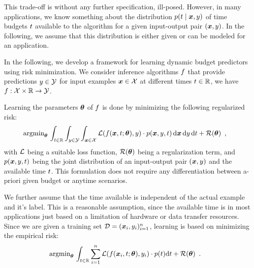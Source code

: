 \documentclass{bmvc2k}
\begin{document}
    This trade-off is without any further specification, ill-posed. However, in many applications,
    we know something about the distribution $p(t \;|\; \bm{x}, y)$ 
    of time budgets $t$ available to the algorithm for a given input-output pair $(\bm{x}, y)$.
    In the following, we assume that this distribution is either given or can be modeled for
    an application. 
    
    In the following, 
    we develop a framework for learning dynamic budget predictors using risk minimization.
    We consider inference algorithms $f$ that provide predictions $y \in \mathcal{Y}$ 
    for input examples $\bm{x} \in \mathcal{X}$
    at different times $t \in \mathbb{R}$, \ie we have $f: \mathcal{X} \times \mathbb{R} \rightarrow \mathcal{Y}$.

    Learning the parameters $\bm{\theta}$ of $f$ 
    is done by minimizing the following regularized risk:
    \begin{align}
        \label{eq:emprisk1}
        &\operatorname{\text{argmin}}_{\bm{\theta}}\, \int_{t \in \mathbb{R}} \int_{y \in \mathcal{Y}} \int_{\bm{x} \in \mathcal{X}} 
        \mathcal{L}( f(\bm{x}, t; \bm{\theta}), y ) \cdot p(\bm{x}, y, t) \,\mathrm{d}\bm{x}\, \mathrm{d}y\, \mathrm{d} t + \mathcal{R}(\bm{\theta}) \enspace,
    \end{align}
    with $\mathcal{L}$ being a suitable loss function, $\mathcal{R}(\bm{\theta})$ being a regularization term,
    and $p(\bm{x}, y, t)$ being the joint distribution of
    an input-output pair $(\bm{x}, y)$ and the available time $t$.
    This formulation does not require any differentiation between a-priori given budget or anytime scenarios.

    We further assume that the time available is independent of the actual
    example and it's label. 
    This is a reasonable assumption, since the available time is in most
    applications just based on a limitation of hardware or data transfer resources.
    Since we are given a training set $\mathcal{D} = (\bm{x}_i, y_i)_{i=1}^{n}$,
    learning is based on minimizing the empirical risk:
    \begin{align}
        \label{eq:emprisk2}
        &\operatorname{\text{argmin}}_{\bm{\theta}}\, \int_{t \in \mathbb{R}} \sum\limits_{i=1}^{n} 
        \mathcal{L}( f(\bm{x}_i, t; \bm{\theta}), y_i ) \cdot p(t) \mathrm{d} t + \mathcal{R}(\bm{\theta}) \enspace.
    \end{align}
    
\end{document}
